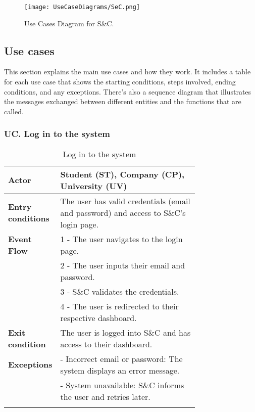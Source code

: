 \begin{figure}[H]
    \begin{center}
        \texttt{[image: UseCaseDiagrams/SeC.png]}
        \caption{Use Cases Diagram for S\&C.} 
        \label{fig:SeCUC}%
    \end{center}
\end{figure}

\subsection{Use cases}
\label{subsec: use_cases}%
\setcounter{uc}{1}
\newcommand{\cuc}{\theuc\stepcounter{uc}}
This section explains the main use cases and how they work. It includes a table for each use case that shows the starting conditions, steps involved, ending conditions, and any exceptions. There's also a sequence diagram that illustrates the messages exchanged between different entities and the functions that are called. \\

\newpage

\subsubsection*{UC\cuc . Log in to the system}
\begin{center}
    \begin{longtable}{|l|p{0.75\linewidth}|}
        \hline
        \textbf{Actor}            & Student (ST), Company (CP), University (UV) \\
        \hline
        \textbf{Entry conditions} & The user has valid credentials (email and password) and access to S\&C's login page. \\
        \hline
        \textbf{Event Flow}       & 1 - The user navigates to the login page. \\
                                  & 2 - The user inputs their email and password. \\
                                  & 3 - S\&C validates the credentials. \\
                                  & 4 - The user is redirected to their respective dashboard. \\
        \hline
        \textbf{Exit condition}   & The user is logged into S\&C and has access to their dashboard. \\       
        \hline
        \textbf{Exceptions}       & - Incorrect email or password: The system displays an error message. \\
                                  & - System unavailable: S\&C informs the user and retries later. \\
        \hline
        \caption{Log in to the system}
        \label{tab:login_usecase}
    \end{longtable}
\end{center}

